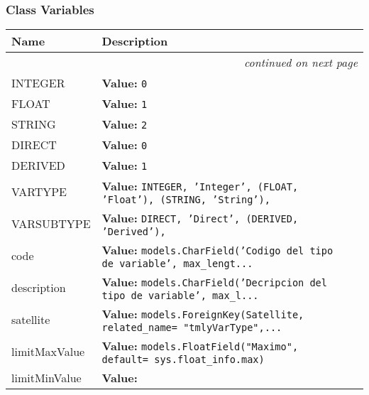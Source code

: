   \subsubsection{Class Variables}

    \vspace{-1cm}
\hspace{\varindent}\begin{longtable}{|p{\varnamewidth}|p{\vardescrwidth}|l}
\cline{1-2}
\cline{1-2} \centering \textbf{Name} & \centering \textbf{Description}& \\
\cline{1-2}
\endhead\cline{1-2}\multicolumn{3}{r}{\small\textit{continued on next page}}\\\endfoot\cline{1-2}
\endlastfoot\raggedright I\-N\-T\-E\-G\-E\-R\- & \raggedright \textbf{Value:} 
{\tt 0}&\\
\cline{1-2}
\raggedright F\-L\-O\-A\-T\- & \raggedright \textbf{Value:} 
{\tt 1}&\\
\cline{1-2}
\raggedright S\-T\-R\-I\-N\-G\- & \raggedright \textbf{Value:} 
{\tt 2}&\\
\cline{1-2}
\raggedright D\-I\-R\-E\-C\-T\- & \raggedright \textbf{Value:} 
{\tt 0}&\\
\cline{1-2}
\raggedright D\-E\-R\-I\-V\-E\-D\- & \raggedright \textbf{Value:} 
{\tt 1}&\\
\cline{1-2}
\raggedright V\-A\-R\-T\-Y\-P\-E\- & \raggedright \textbf{Value:} 
{\tt INTEGER, 'Integer', (FLOAT, 'Float'), (STRING, 'String'),}&\\
\cline{1-2}
\raggedright V\-A\-R\-S\-U\-B\-T\-Y\-P\-E\- & \raggedright \textbf{Value:} 
{\tt DIRECT, 'Direct', (DERIVED, 'Derived'),}&\\
\cline{1-2}
\raggedright c\-o\-d\-e\- & \raggedright \textbf{Value:} 
{\tt models.CharField('Codigo del tipo de variable', max\_lengt\texttt{...}}&\\
\cline{1-2}
\raggedright d\-e\-s\-c\-r\-i\-p\-t\-i\-o\-n\- & \raggedright \textbf{Value:} 
{\tt models.CharField('Decripcion del tipo de variable', max\_l\texttt{...}}&\\
\cline{1-2}
\raggedright s\-a\-t\-e\-l\-l\-i\-t\-e\- & \raggedright \textbf{Value:} 
{\tt models.ForeignKey(Satellite, related\_name= "tmlyVarType",\texttt{...}}&\\
\cline{1-2}
\raggedright l\-i\-m\-i\-t\-M\-a\-x\-V\-a\-l\-u\-e\- & \raggedright \textbf{Value:} 
{\tt models.FloatField("Maximo", default= sys.float\_info.max)}&\\
\cline{1-2}
\raggedright l\-i\-m\-i\-t\-M\-i\-n\-V\-a\-l\-u\-e\- & \raggedright \textbf{Value:} 

\end{longtable}
